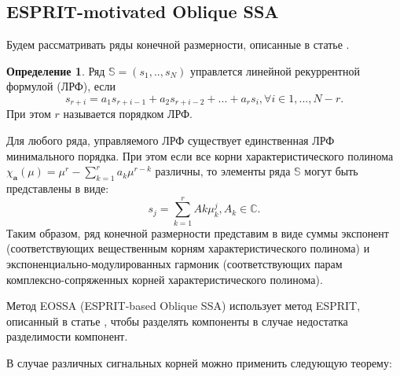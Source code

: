 \documentclass[specialist,
               substylefile = spbu_report.rtx,
               subf,href,colorlinks=true, 12pt]{disser}
\theoremstyle{definition}
\newtheorem{definition}{Определение}
\begin{document}
    \subsection{ESPRIT-motivated Oblique SSA}
    Будем рассматривать ряды конечной размерности, описанные в статье \cite{Shlemov}.
    \begin{definition}
        Ряд $\mathbb{S} = (s_1, .., s_N)$ управлется линейной рекуррентной формулой (ЛРФ), если
        \begin{equation*}
            s_{r+i} = a_1s_{r+i - 1} + a_2s_{r+i - 2} + . . . + a_rs_i
, \forall i \in 1, . . . , N - r.
        \end{equation*}
        При этом $r$ называется порядком ЛРФ.
    \end{definition}
    Для любого ряда, управляемого ЛРФ существует единственная ЛРФ минимального порядка.
    При этом если все корни характеристического полинома $\chi_{\mathbf{a}} (\mu ) = \mu^r - \sum^r_{k=1} a_k\mu^{r - k}$ различны, то элементы ряда $\mathbb{S}$ могут быть представлены в виде:
    \begin{equation*}
        s_j =\sum^r_{k=1} Ak\mu^j_k
, A_k \in \mathbb{C}.
    \end{equation*}
    Таким образом, ряд конечной размерности представим в виде
суммы экспонент (соответствующих вещественным корням характеристического полинома) и
экспоненциально-модулированных гармоник (соответствующих парам
комплексно-сопряженных корней характеристического полинома).

Метод EOSSA (ESPRIT-based Oblique SSA) использует метод ESPRIT, описанный в статье \cite{Roy89}, чтобы разделять компоненты в случае недостатка разделимости компонент.

В случае различных сигнальных корней можно применить следующую теорему:
\end{document}
